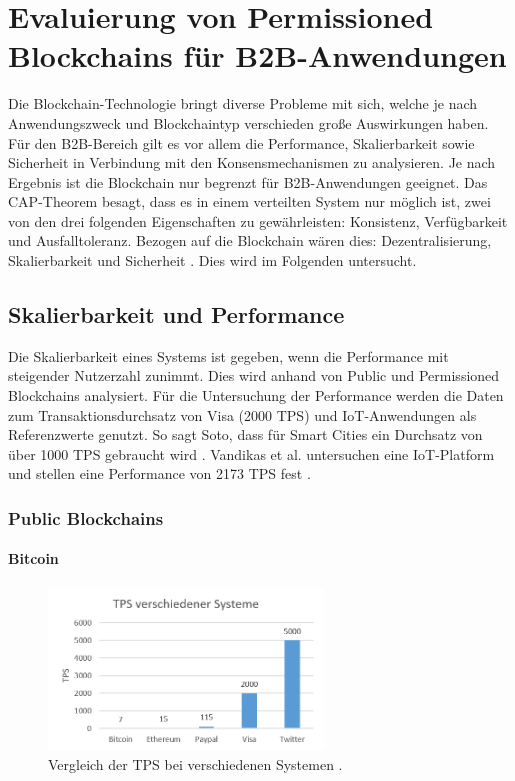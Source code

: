 \chapter{Evaluierung von Permissioned Blockchains für B2B-Anwendungen}
\label{cha:b2b-eval}

Die Blockchain-Technologie bringt diverse Probleme mit sich, welche je nach Anwendungszweck und Blockchaintyp verschieden große Auswirkungen haben. Für den \acs{B2B}-Bereich gilt es vor allem die Performance, Skalierbarkeit sowie Sicherheit in Verbindung mit den Konsensmechanismen zu analysieren. Je nach Ergebnis ist die Blockchain nur begrenzt für \acs{B2B}-Anwendungen geeignet. Das CAP-Theorem besagt, dass es in einem verteilten System nur möglich ist, zwei von den drei folgenden Eigenschaften zu gewährleisten: Konsistenz, Verfügbarkeit und Ausfalltoleranz. Bezogen auf die Blockchain wären dies: Dezentralisierung, Skalierbarkeit und Sicherheit \cite{SchererPerformanceScalabilityBlockchain2017}. Dies wird im Folgenden untersucht.

\section{Skalierbarkeit und Performance}
\label{sec:scalability-eval}
Die Skalierbarkeit eines Systems ist gegeben, wenn die Performance mit steigender Nutzerzahl zunimmt. Dies wird anhand von Public und Permissioned Blockchains analysiert. Für die Untersuchung der Performance werden die Daten zum Transaktionsdurchsatz von Visa (2000 \acs{TPS}) und \acs{IoT}-Anwendungen als Referenzwerte genutzt. So sagt Soto, dass für Smart Cities ein Durchsatz von über 1000 \acs{TPS} gebraucht wird \cite{AraujoSotoPerformanceevaluationscalable2017}. Vandikas et al. untersuchen eine \acs{IoT}-Platform und stellen eine Performance von 2173 \acs{TPS} fest \cite{VandikasPerformanceEvaluationIoT2014}. 

\subsection{Public Blockchains}


\subsubsection{Bitcoin}

\begin{figure}[!htbp]
  \centering
    \includegraphics[width=0.65\textwidth,angle=0]{images/tps-comparison}
    \caption{Vergleich der \acs{TPS} bei verschiedenen Systemen \cite[S.~28]{SwanBlockchainblueprintnew2015}\cite{BitcoinTeamScalabilityBitcoinWiki}.}
    \label{fig:tps-comparison}
\end{figure} 

